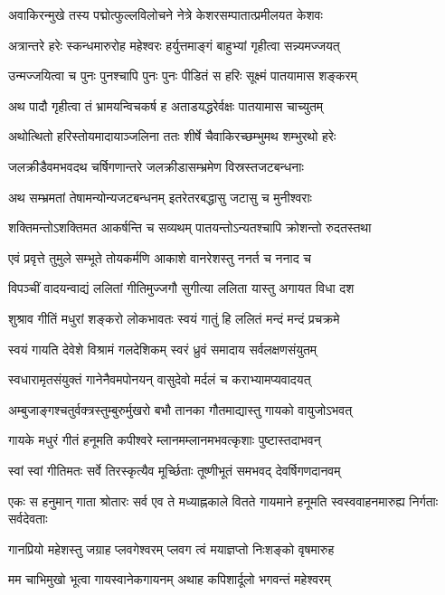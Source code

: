 \twolineshloka
{अवाकिरन्मुखे तस्य पद्मोत्फुल्लविलोचने}
{नेत्रे केशरसम्पातात्प्रमीलयत केशवः}%

\twolineshloka
{अत्रान्तरे हरेः स्कन्धमारुरोह महेश्वरः}
{हर्युत्तमाङ्गं बाहुभ्यां गृहीत्वा सन्न्यमज्जयत्}%

\twolineshloka
{उन्मज्जयित्वा च पुनः पुनश्चापि पुनः पुनः}
{पीडितं स हरिः सूक्ष्मं पातयामास शङ्करम्}%

\twolineshloka
{अथ पादौ गृहीत्वा तं भ्रामयन्विचकर्ष ह}
{अताडयद्धरेर्वक्षः पातयामास चाच्युतम्}%

\twolineshloka
{अथोत्थितो हरिस्तोयमादायाञ्जलिना ततः}
{शीर्षे चैवाकिरच्छम्भुमथ शम्भुरथो हरेः}%

\twolineshloka
{जलक्रीडैवमभवदथ चर्षिगणान्तरे}
{जलक्रीडासम्भ्रमेण विस्रस्तजटबन्धनाः}%

\twolineshloka
{अथ सम्भ्रमतां तेषामन्योन्यजटबन्धनम्}
{इतरेतरबद्धासु जटासु च मुनीश्वराः}%

\twolineshloka
{शक्तिमन्तोऽशक्तिमत आकर्षन्ति च सव्यथम्}
{पातयन्तोऽन्यतश्चापि क्रोशन्तो रुदतस्तथा}%

\twolineshloka
{एवं प्रवृत्ते तुमुले सम्भूते तोयकर्मणि}
{आकाशे वानरेशस्तु ननर्त च ननाद च}%

\twolineshloka
{विपञ्चीं वादयन्वाद्यं ललितां गीतिमुज्जगौ}
{सुगीत्या ललिता यास्तु अगायत विधा दश}%

\twolineshloka
{शुश्राव गीतिं मधुरां शङ्करो लोकभावतः}
{स्वयं गातुं हि ललितं मन्दं मन्दं प्रचक्रमे}%

\twolineshloka
{स्वयं गायति देवेशे विश्रामं गलदेशिकम्}
{स्वरं ध्रुवं समादाय सर्वलक्षणसंयुतम्}%

\twolineshloka
{स्वधारामृतसंयुक्तं गानेनैवमपोनयन्}
{वासुदेवो मर्दलं च कराभ्यामप्यवादयत्}%

\twolineshloka
{अम्बुजाङ्गश्चतुर्वक्त्रस्तुम्बुरुर्मुखरो बभौ}
{तानका गौतमाद्यास्तु गायको वायुजोऽभवत्}%

\twolineshloka
{गायके मधुरं गीतं हनूमति कपीश्वरे}
{म्लानमम्लानमभवत्कृशाः पुष्टास्तदाभवन्}%

\twolineshloka
{स्वां स्वां गीतिमतः सर्वे तिरस्कृत्यैव मूर्च्छिताः}
{तूष्णीभूतं समभवद् देवर्षिगणदानवम्}%

\threelineshloka
{एकः स हनुमान् गाता श्रोतारः सर्व एव ते}
{मध्याह्नकाले वितते गायमाने हनूमति}
{स्वस्ववाहनमारुह्य निर्गताः सर्वदेवताः}%

\twolineshloka
{गानप्रियो महेशस्तु जग्राह प्लवगेश्वरम्}
{प्लवग त्वं मयाज्ञप्तो निःशङ्को वृषमारुह}%

\twolineshloka
{मम चाभिमुखो भूत्वा गायस्वानेकगायनम्}
{अथाह कपिशार्दूलो भगवन्तं महेश्वरम्}%


